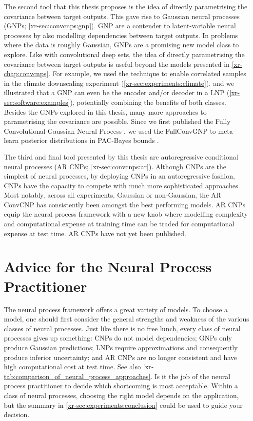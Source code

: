 \documentclass[12pt, twoside]{report}
\newcommand{\xrprefix}[1]{xr-#1}
\begin{document}
The second tool that this thesis proposes is the idea of directly parametrising the covariance between target outputs.
This gave rise to Gaussian neural processes (GNPs; \cref{\xrprefix{sec:convcnps:gnp}}).
GNP are a contender to latent-variable neural processes \parencite[LNPs;][]{Garnelo:2018:Neural_Processes}
by also modelling dependencies between target outputs.
In problems where the data is roughly Gaussian, GNPs are a promising new model class to explore.
Like with convolutional deep sets, the idea of directly parametrising the covariance between target outputs is useful beyond the models presented in \cref{\xrprefix{chap:convcnps}}.
For example, we used the technique to enable correlated samples in the climate downscaling experiment (\cref{\xrprefix{sec:experiments:climate}}), 
and we illustrated that a GNP can even be the encoder and/or decoder in a LNP (\cref{\xrprefix{sec:software:examples}}), potentially combining the benefits of both classes.
Besides the GNPs explored in this thesis,
many more approaches to parametrising the covariance are possible. 
Since we first published the Fully Convolutional Gaussian Neural Process \parencite[FullConvGNP;][]{Bruinsma:2021:The_Gaussian_Neural_Process,Markou:2022:Practical_Conditional_Neural_Processes_for_Tractable}, we used the FullConvGNP to meta-learn posterior distributions in PAC-Bayes bounds \parencite{Foong:2021:How_Tight_Can_PAC-Bayes_Be}.

The third and final tool presented by this thesis are autoregressive conditional neural processes (AR CNPs; \cref{\xrprefix{sec:convcnps:ar}}).
Although CNPs are the simplest of neural processes,
by deploying CNPs in an autoregressive fashion, CNPs have the capacity to compete with much more sophisticated approaches.
Most notably, across all experiments, Gaussian or non-Gaussian, the AR ConvCNP has consistently been amongst the best performing models.
AR CNPs equip the neural process framework with a new knob where modelling complexity and computational expense at training time can be traded for computational expense at test time.
AR CNPs have not yet been published.

\section{Advice for the Neural Process Practitioner}

The neural process framework offers a great variety of models.
To choose a model, one should first consider the general strengths and weakness of the various classes of neural processes.
Just like there is no free lunch,
every class of neural processes gives up something:
CNPs do not model dependencies;
GNPs only produce Gaussian predictions;
LNPs require approximations and consequently produce inferior uncertainty; 
and AR CNPs are no longer consistent and have high computational cost at test time.
See also
\cref{\xrprefix{tab:comparison_of_neural_process_approaches}}.
Is it the job of the neural process practitioner to decide which shortcoming is most acceptable.
Within a class of neural processes, choosing the right model depends on the application,
but the summary in \cref{\xrprefix{sec:experiments:conclusion}} could be used to guide your decision.
\end{document}
